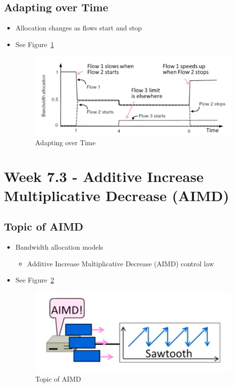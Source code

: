 \documentclass[12pt]{ctexart}   %
\begin{document}
	\subsection{Adapting over Time}
	\begin{itemize}
		\item Allocation changes as flows start and stop
		 \item See Figure~\ref{fig:7-2-10}
		  
		 \begin{figure}[h!] %
		\centering
		 \includegraphics[scale=0.7]{images/7-2-10}
		\caption{ Adapting over Time }
		 \label{fig:7-2-10}
		 \end{figure}
	\end{itemize}
	
\section{Week 7.3 - Additive Increase Multiplicative Decrease (AIMD)}
	\subsection{Topic of AIMD}
	\begin{itemize}
		\item Bandwidth allocation models
		\begin{itemize}
			\item Additive Increase Multiplicative Decrease (AIMD) control law
		\end{itemize}
		 \item See Figure~\ref{fig:7-3-1}
		  
		 \begin{figure}[h!] %
		\centering
		 \includegraphics[scale=0.7]{images/7-3-1}
		\caption{ Topic of AIMD }
		 \label{fig:7-3-1}
		 \end{figure}
	\end{itemize}
	
\end{document}
